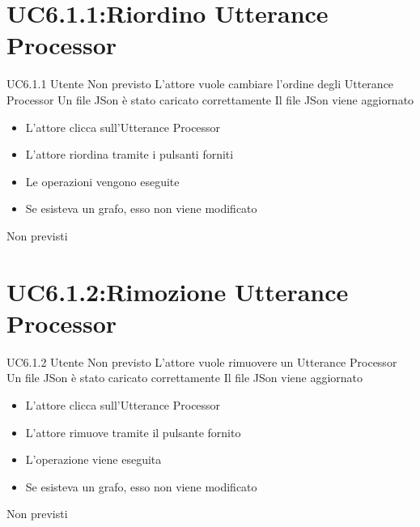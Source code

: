 \documentclass[../AnalisideiRequisiti.tex]{subfiles}
\begin{document}
\section{UC6.1.1:Riordino Utterance Processor}
\UserCase
{UC6.1.1}
{Utente}
{Non previsto}
{L'attore vuole cambiare l'ordine degli Utterance Processor}
{Un file JSon è stato caricato correttamente }
{Il file JSon viene aggiornato}
{
	\begin{itemize}
		\item{} L'attore clicca sull'Utterance Processor 
		\item{} L'attore riordina tramite i pulsanti forniti	
		\item{} Le operazioni vengono eseguite
		\item{} Se esisteva un grafo, esso non viene modificato
		
	\end{itemize}
}
{Non previsti}

\section{UC6.1.2:Rimozione Utterance Processor}
\UserCase
{UC6.1.2}
{Utente}
{Non previsto}
{L'attore vuole rimuovere un Utterance Processor}
{Un file JSon è stato caricato  correttamente }
{Il file JSon viene aggiornato}
{
	\begin{itemize}
		\item{} L'attore clicca sull'Utterance Processor 
		\item{} L'attore rimuove tramite il pulsante fornito	
		\item{} L'operazione viene eseguita
		\item{} Se esisteva un grafo, esso non viene modificato
		
	\end{itemize}
}
{Non previsti}
\end{document}
